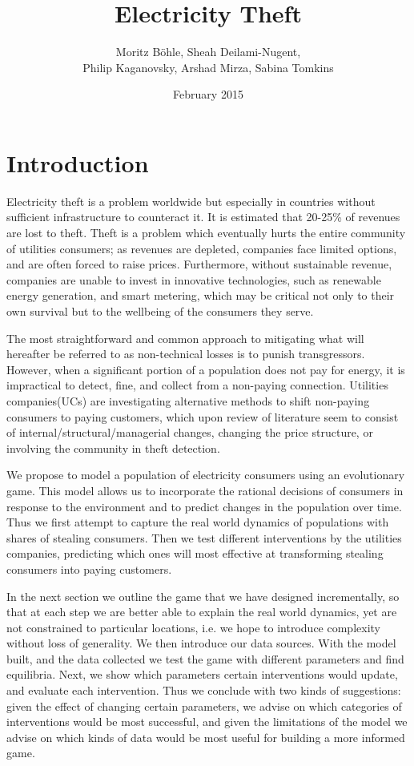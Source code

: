 \documentclass{article}
\title{\textbf{Electricity Theft}}
\author{Moritz B\"{o}hle, Sheah Deilami-Nugent, 
\\Philip Kaganovsky, Arshad Mirza, Sabina Tomkins }
\date{February 2015}
\begin{document}
\maketitle

\section{Introduction}
Electricity theft is a problem worldwide but especially in countries without sufficient infrastructure to counteract it. It is estimated that 20-25\% of revenues are lost to theft. Theft is a problem which eventually hurts the entire community of utilities consumers; as revenues are depleted, companies face limited options, and are often forced to raise prices. Furthermore, without sustainable revenue, companies are unable to invest in innovative technologies, such as renewable energy generation, and smart metering, which may be critical not only to their own survival but to the wellbeing of the consumers they serve.

	The most straightforward and common approach to mitigating what will hereafter be referred to as non-technical losses is to punish transgressors. However, when a significant portion of a population does not pay for energy, it is impractical to detect, fine, and collect from a non-paying connection. Utilities companies(UCs) are investigating alternative methods to shift non-paying consumers to paying customers, which upon review of literature seem to consist of internal/structural/managerial changes, changing the price structure, or involving the community in theft detection.

	We propose to model a population of electricity consumers using an evolutionary game. This model allows us to incorporate the rational decisions of consumers in response to the environment and to predict changes in the population over time. Thus we first attempt to capture the real world dynamics of populations with shares of stealing consumers. Then we test different interventions by the utilities companies, predicting which ones will most effective at transforming stealing consumers into paying customers. 

	In the next section we outline the game that we have designed incrementally, so that at each step we are better able to explain the real world dynamics, yet are not constrained to particular locations, i.e. we hope to introduce complexity without loss of generality. We then introduce our data sources. With the model built, and the data collected we test the game with different parameters and find equilibria. Next, we show which parameters certain interventions would update, and evaluate each intervention. Thus we conclude with two kinds of suggestions: given the effect of changing certain parameters, we advise on which categories of interventions would be most successful, and given the limitations of the model we advise on which kinds of data would be most useful for building a more informed game. 
\end{document}
